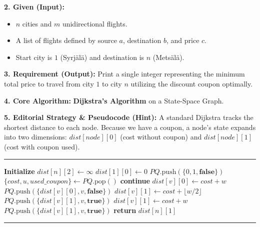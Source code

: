 \textbf{2. Given (Input):}
\begin{itemize}
    \item $n$ cities and $m$ unidirectional flights.
    \item A list of flights defined by source $a$, destination $b$, and price $c$.
    \item Start city is $1$ (Syrjälä) and destination is $n$ (Metsälä).
\end{itemize}

\textbf{3. Requirement (Output):}
Print a single integer representing the minimum total price to travel from city $1$ to city $n$ utilizing the discount coupon optimally.

\textbf{4. Core Algorithm:} 
\textbf{Dijkstra's Algorithm} on a State-Space Graph.

\textbf{5. Editorial Strategy \& Pseudocode (Hint):}
A standard Dijkstra tracks the shortest distance to each node. Because we have a coupon, a node's state expands into two dimensions: $dist[node][0]$ (cost without coupon) and $dist[node][1]$ (cost with coupon used).

\vspace{0.5em}
\noindent\rule{\textwidth}{0.6pt}
\begin{algorithmic}[1]
\State \textbf{Initialize} $dist[n][2] \gets \infty$
\State $dist[1][0] \gets 0$
\State $PQ.\text{push}(\{0, 1, \textbf{false}\})$ 
\Statex
{}
    \State $\{cost, u, used\_coupon\} \gets PQ.\text{pop}()$
        \State \textbf{continue} 
    \EndIf
    \Statex
             
                \State $dist[v][0] \gets cost + w$
                \State $PQ.\text{push}(\{dist[v][0], v, \textbf{false}\})$
            \EndIf
             
                \State $dist[v][1] \gets cost + \lfloor w / 2 \rfloor$
                \State $PQ.\text{push}(\{dist[v][1], v, \textbf{true}\})$
            \EndIf
             
                \State $dist[v][1] \gets cost + w$
                \State $PQ.\text{push}(\{dist[v][1], v, \textbf{true}\})$
            \EndIf
        \EndIf
    \EndFor
\EndWhile
\State \textbf{return} $dist[n][1]$
\end{algorithmic}
\vspace{-0.5em}
\noindent\rule{\textwidth}{0.6pt}
\vspace{0.5em}

